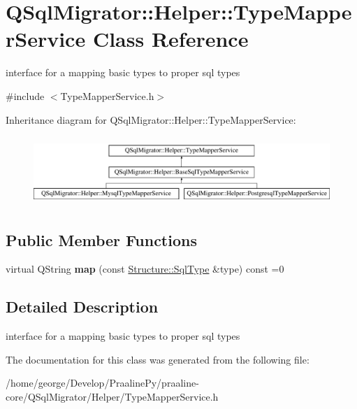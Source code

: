 \hypertarget{class_q_sql_migrator_1_1_helper_1_1_type_mapper_service}{}\section{Q\+Sql\+Migrator\+:\+:Helper\+:\+:Type\+Mapper\+Service Class Reference}
\label{class_q_sql_migrator_1_1_helper_1_1_type_mapper_service}


interface for a mapping basic types to proper sql types  




{\ttfamily \#include $<$Type\+Mapper\+Service.\+h$>$}

Inheritance diagram for Q\+Sql\+Migrator\+:\+:Helper\+:\+:Type\+Mapper\+Service\+:\begin{figure}[H]
\begin{center}
\leavevmode
\includegraphics[height=2.633229cm]{class_q_sql_migrator_1_1_helper_1_1_type_mapper_service}
\end{center}
\end{figure}
\subsection*{Public Member Functions}
\begin{DoxyCompactItemize}
\item 
\mbox{\label{class_q_sql_migrator_1_1_helper_1_1_type_mapper_service_aa0d9608ce4020ad955fa1bcfa702adf3}} 
virtual Q\+String {\bfseries map} (const \hyperlink{class_q_sql_migrator_1_1_structure_1_1_sql_type}{Structure\+::\+Sql\+Type} \&type) const =0
\end{DoxyCompactItemize}


\subsection{Detailed Description}
interface for a mapping basic types to proper sql types 

The documentation for this class was generated from the following file\+:\begin{DoxyCompactItemize}
\item 
/home/george/\+Develop/\+Praaline\+Py/praaline-\/core/\+Q\+Sql\+Migrator/\+Helper/Type\+Mapper\+Service.\+h\end{DoxyCompactItemize}
